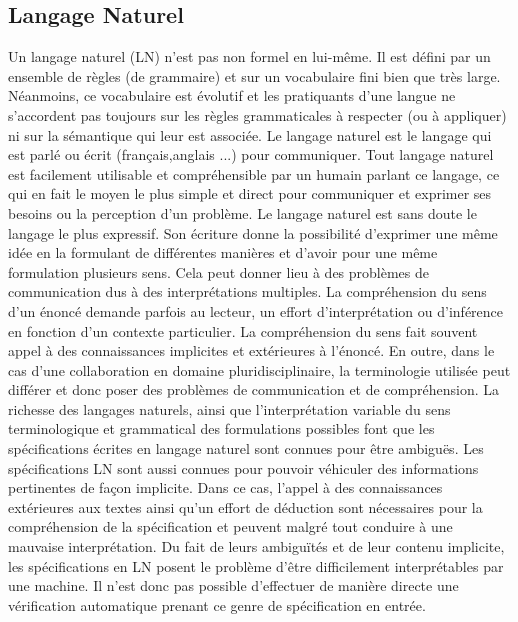 \documentclass[french]{spimufcphdthesis}
\begin{document}
\subsection{Langage Naturel}
Un langage naturel (LN) n’est pas non formel en lui-même. Il est défini par un ensemble de règles (de grammaire) et sur un vocabulaire fini bien que très large. Néanmoins, ce vocabulaire est évolutif et les pratiquants  d’une  langue  ne  s’accordent  pas  toujours  sur  les  règles grammaticales à respecter (ou à appliquer) ni sur la sémantique qui leur est associée.
Le  langage  naturel  est  le  langage  qui  est  parlé  ou  écrit  (français,anglais  ...)  pour  communiquer.  Tout  langage  naturel  est  facilement utilisable  et compréhensible  par  un  humain  parlant  ce  langage,  ce
qui  en  fait  le  moyen  le  plus  simple  et  direct  pour  communiquer  et exprimer ses besoins ou la perception d’un problème.
Le langage naturel est sans doute le langage le plus expressif. 
Son écriture donne la possibilité d’exprimer une même idée en la formulant  de  différentes  manières  et  d’avoir  pour  une  même  formulation plusieurs sens.  Cela  peut  donner  lieu  à  des  problèmes  de  communication  dus  à  des  interprétations  multiples.  La  compréhension  du
sens d’un énoncé demande parfois au lecteur, un effort d’interprétation ou d’inférence en fonction d’un contexte particulier.
La compréhension du sens fait souvent appel à des connaissances implicites et extérieures à l’énoncé. En outre, dans le cas d’une collaboration en domaine pluridisciplinaire, la terminologie utilisée peut différer et donc poser des problèmes de communication et de compréhension.
La richesse des langages naturels, ainsi que l’interprétation variable du  sens  terminologique  et  grammatical  des  formulations  possibles font  que  les  spécifications  écrites  en  langage  naturel  sont  connues pour  être  ambiguës.  Les  spécifications  LN  sont  aussi  connues  pour pouvoir  véhiculer  des  informations  pertinentes  de  façon  implicite.
Dans ce cas, l’appel à des connaissances extérieures aux textes ainsi qu’un effort de déduction sont nécessaires pour la compréhension de la spécification et peuvent malgré tout conduire à une mauvaise interprétation.
Du fait de leurs ambiguïtés et de leur contenu implicite, les spécifications en LN posent le problème d’être difficilement interprétables par une machine. Il n’est donc pas possible d’effectuer de manière directe une vérification automatique prenant ce genre de spécification en entrée.
\end{document}
